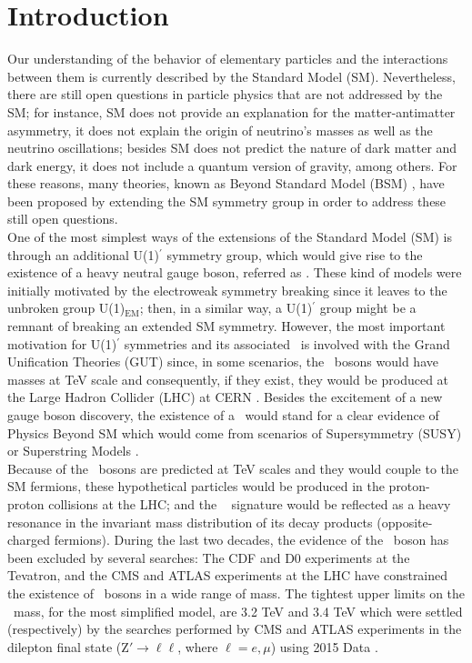 \chapter*{Introduction}

Our understanding of the behavior of elementary particles and the interactions between them is 
currently described by the Standard Model (SM). Nevertheless, there are still open 
questions in particle physics that are not addressed by the SM; for instance, SM does 
not provide an explanation for the matter-antimatter asymmetry, it does not explain the origin of neutrino's masses as well as the 
neutrino oscillations; besides SM does not predict the nature of dark matter and dark energy,
it does not include a quantum version of gravity, among others. For these reasons, 
many theories, known as Beyond Standard Model (BSM) \cite{BSM}, have been proposed by extending the SM symmetry group
in order to address these still open questions. \\

One of the most simplest ways of the extensions of the Standard Model (SM) is through an additional
U(1)$^{\prime}$ symmetry group, which would give rise to the existence of a heavy neutral gauge boson, referred as \Zprime. These 
kind of models were initially motivated by the electroweak symmetry breaking since it leaves to the unbroken group 
U(1)$_{\text{EM}}$; then, in a similar way, a U(1)$^{\prime}$ group might be a remnant of breaking  
an extended SM symmetry. However, the most important motivation for U(1)$^{\prime}$ symmetries 
and its associated \Zprime~is involved with the Grand Unification Theories (GUT) since, in some scenarios, the \Zprime~bosons
would have masses at TeV scale and consequently, if they exist, they would be produced at the Large Hadron 
Collider (LHC) at CERN \cite{Langacker:2008yv}. Besides the excitement of a new gauge boson discovery, the existence 
of a \Zprime~would stand for a clear evidence of Physics Beyond SM which would come from scenarios of 
Supersymmetry (SUSY) or Superstring Models \cite{Langacker:2008yv}. \\

Because of the \Zprime~bosons are predicted at TeV scales and they would couple to the SM fermions, 
these hypothetical particles would be produced in the proton-proton collisions at the LHC; and the \Zprime~ 
signature would be reflected as a heavy resonance in the invariant mass distribution of its decay products 
(opposite-charged fermions). During the last two decades, the evidence of the \Zprime~boson 
has been excluded by several searches: The CDF and D0 experiments at the Tevatron, and the CMS and ATLAS experiments 
at the LHC have constrained the existence of \Zprime~bosons in a wide range of mass. The tightest 
upper limits on the \Zprime~mass, for the most simplified model, are 3.2 TeV and 3.4 TeV which were 
settled (respectively) by the searches performed by CMS and ATLAS experiments in the dilepton final 
state (Z$'\rightarrow \ell\ell$, where $\ell=e, \mu$) using 2015 Data \cite{CMSZprime2dileptonbib,ATLASZprime2dileptonbib}. \\

